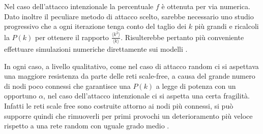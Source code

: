 Nel caso dell'attacco intenzionale la percentuale $f$ \`e ottenuta per via numerica. Dato inoltre il peculiare metodo di attacco scelto, sarebbe necessario uno studio progressivo che a ogni iterazione tenga conto del taglio dei $k$ pi\`u grandi e ricalcoli la $P(k)$ per ottenere il rapporto $\frac{\langle k^2 \rangle}{\langle k \rangle}$. Risulterebbe pertanto pi\`u conveniente effettuare simulazioni numeriche direttamente sui modelli \parencite{Cohen2001}.

In ogni caso, a livello qualitativo, come nel caso di attacco random ci si aspettava una maggiore resistenza da parte delle reti scale-free, a causa del grande numero di nodi poco connessi che garantisce una $P(k)$ a legge di potenza con un opportuno $\alpha$, nel caso dell'attacco intenzionale ci si aspetta una certa fragilit\`a. Infatti le reti scale free sono costruite attorno ai nodi pi\`u connessi, si pu\`o supporre quindi che rimuoverli per primi provochi un deterioramento pi\`u veloce rispetto a una rete random con uguale grado medio \parencite{Barbalbert2002}.


